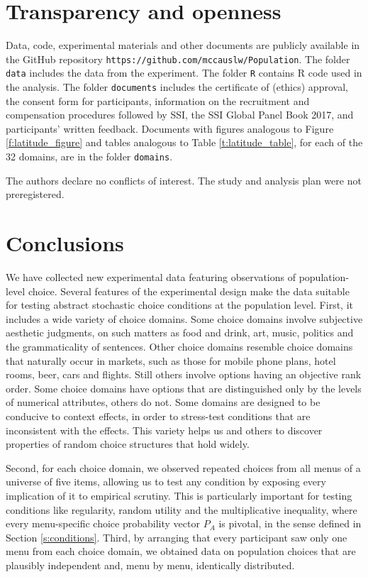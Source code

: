 \documentclass[11pt,letter]{article}
\newcommand{\menu}{menu}
\newcommand{\menus}{menus}
\begin{document}
\section{Transparency and openness}\label{s:trans}

Data, code, experimental materials and other documents are publicly available in the GitHub repository \texttt{https://github.com/mccauslw/Population}.
The folder \texttt{data} includes the data from the experiment.
The folder \texttt{R} contains R code used in the analysis.
The folder \texttt{documents} includes the certificate of (ethics) approval, the consent form for participants, information on the recruitment and compensation procedures followed by SSI, the SSI Global Panel Book 2017, and participants' written feedback.
Documents with figures analogous to Figure \ref{f:latitude_figure} and tables analogous to Table \ref{t:latitude_table}, for each of the 32 domains, are in the folder \texttt{domains}.

The authors declare no conflicts of interest.
The study and analysis plan were not preregistered.

\section{Conclusions}\label{s:conclude}

We have collected new experimental data featuring observations of population-level choice.
Several features of the experimental design make the data suitable for testing abstract stochastic choice conditions at the population level.
First, it includes a wide variety of choice domains.
Some choice domains involve subjective aesthetic judgments, on such matters as food and drink, art, music, politics and the grammaticality of sentences.
Other choice domains resemble choice domains that naturally occur in markets, such as those for mobile phone plans, hotel rooms, beer, cars and flights.
Still others involve options having an objective rank order.
Some choice domains have options that are distinguished only by the levels of numerical attributes, others do not.
Some domains are designed to be conducive to context effects, in order to stress-test conditions that are inconsistent with the effects.
This variety helps us and others to discover properties of random choice structures that hold widely.

Second, for each choice domain, we observed repeated choices from all \menus{} of a universe of five items, allowing us to test any condition by exposing every implication of it to empirical scrutiny.
This is particularly important for testing conditions like regularity, random utility and the multiplicative inequality, where every \menu{}-specific choice probability vector $P_A$ is pivotal, in the sense defined in Section \ref{s:conditions}.
Third, by arranging that every participant saw only one \menu{} from each choice domain, we obtained data on population choices that are plausibly independent and, \menu{} by \menu{}, identically distributed.
\end{document}
